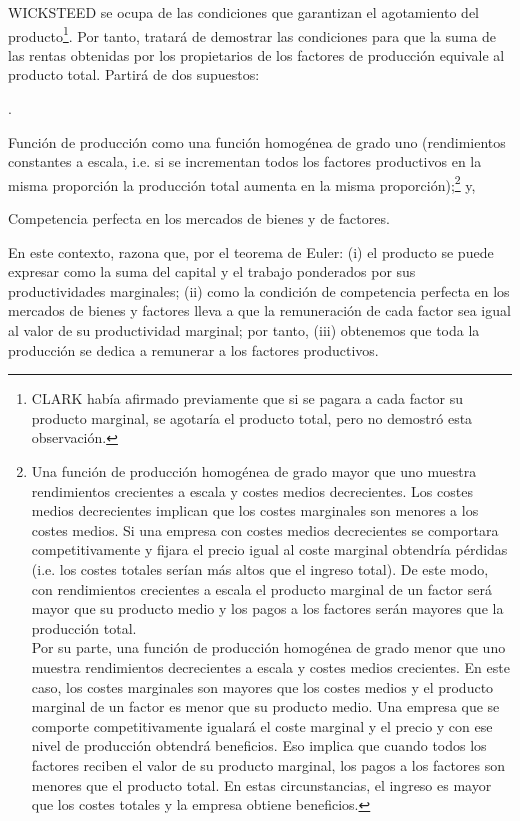 \documentclass[10pt,a4paper]{article}
\newcounter{numitem}
\newenvironment{lnum}
 {\begin{list}{\arabic{numitem}.}{%
  \usecounter{numitem}%
  \setlength{\leftmargin}{1cm}%
  \setlength{\parskip}{3pt}%
  \setlength{\itemsep}{0pt}%
  \setlength{\parsep}{0pt}%
 }}
 {\end{list}}
\begin{document}
WICKSTEED se ocupa de las condiciones que garantizan el agotamiento del producto\footnote{%
    CLARK había afirmado previamente que si se pagara a cada factor su producto marginal, se agotaría el producto total, pero no demostró esta observación.
}. Por tanto, tratará de demostrar las condiciones para que la suma de las rentas obtenidas por los propietarios de los factores de producción equivale al producto total. Partirá de dos supuestos:
\begin{lnum}
    \item Función de producción como una función homogénea de grado uno (rendimientos constantes a escala, i.e. si se incrementan todos los factores productivos en la misma proporción la producción total aumenta en la misma proporción);\footnote{%
        Una función de producción homogénea de grado mayor que uno muestra rendimientos crecientes a escala y costes medios decrecientes. Los costes medios decrecientes implican que los costes marginales son menores a los costes medios. Si una empresa con costes medios decrecientes se comportara competitivamente y fijara el precio igual al coste marginal obtendría pérdidas (i.e. los costes totales serían más altos que el ingreso total). De este modo, con rendimientos crecientes a escala el producto marginal de un factor será mayor que su producto medio y los pagos a los factores serán mayores que la producción total.\\
Por su parte, una función de producción homogénea de grado menor que uno muestra rendimientos decrecientes a escala y costes medios crecientes. En este caso, los costes marginales son mayores que los costes medios y el producto marginal de un factor es menor que su producto medio. Una empresa que se comporte competitivamente igualará el coste marginal y el precio y con ese nivel de producción obtendrá beneficios. Eso implica que cuando todos los factores reciben el valor de su producto marginal, los pagos a los factores son menores que el producto total. En estas circunstancias, el ingreso es mayor que los costes totales y la empresa obtiene beneficios.
    } y,
    \item Competencia perfecta en los mercados de bienes y de factores.
\end{lnum}

En este contexto, razona que, por el teorema de Euler: (i) el producto se puede expresar como la suma del capital y el trabajo ponderados por sus productividades marginales; (ii) como la condición de competencia perfecta en los mercados de bienes y factores lleva a que la remuneración de cada factor sea igual al valor de su productividad marginal; por tanto, (iii) obtenemos que toda la producción se dedica a remunerar a los factores productivos. 
\end{document}
